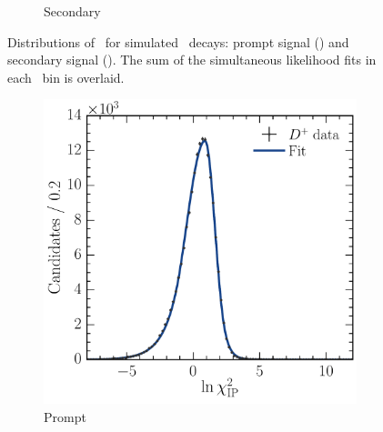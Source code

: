 \begin{figure}
\begin{subfigure}[b]{0.5\textwidth}
    \caption{Secondary}
    \label{fig:prod:fitting:prefits:D0ToKpi:secondary}
  \end{subfigure}
  \caption{%
    Distributions of \lnipchisq\ for simulated \DzToKpi\ decays: prompt signal 
    \PDzero () and secondary 
    signal \PDzero ().
    The sum of the simultaneous likelihood fits in each \pTy\ bin is overlaid.
  }
  \label{fig:prod:fitting:prefits:D0ToKpi}
\end{figure}

\begin{figure}
  \begin{subfigure}[b]{0.5\textwidth}
    \centering
    \includegraphics[width=\textwidth]{figures/production/fitting/DpToKpipi_ipchisq_fit_pT_integrated_y_integrated_sig}
    \caption{Prompt}
    \label{fig:prod:fitting:prefits:DpToKpipi:prompt}
  \end{subfigure}
  \begin{subfigure}[b]{0.5\textwidth}
    \centering

\end{subfigure}
\end{figure}
